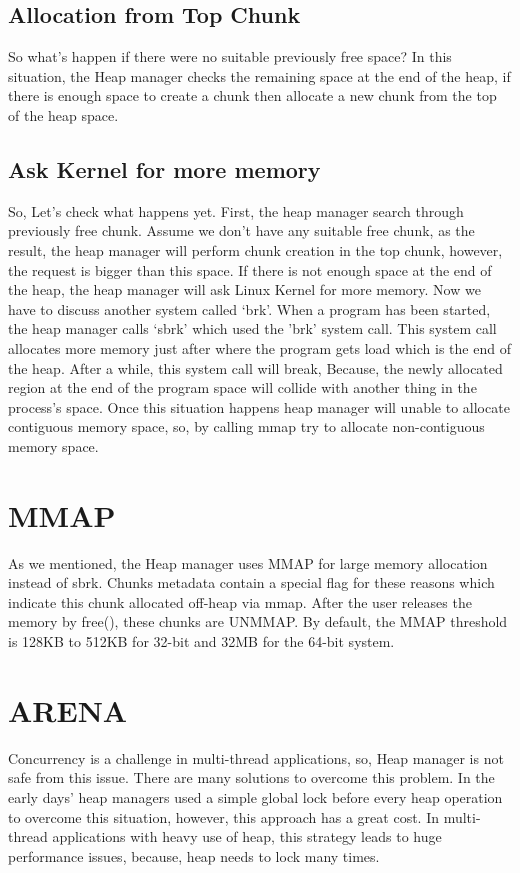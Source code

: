 \documentclass{masterthesis}
\begin{document}
\subsection{Allocation from Top Chunk}
So what’s happen if there were no suitable previously free space? In this situation, the Heap manager checks the remaining space at the end of the heap, if there is enough space to create a chunk then allocate a new chunk from the top of the heap space. 

\subsection{Ask Kernel for more memory}
So, Let's check what happens yet. First, the heap manager search through previously free chunk. Assume we don't have any suitable free chunk, as the result, the heap manager will perform chunk creation in the top chunk, however, the request is bigger than this space. If there is not enough space at the end of the heap, the heap manager will ask Linux Kernel for more memory. Now we have to discuss another system called ‘brk’. When a program has been started, the heap manager calls ‘sbrk’ which used the 'brk' system call. This system call allocates more memory just after where the program gets load which is the end of the heap. 
After a while, this system call will break, Because, the newly allocated region at the end of the program space will collide with another thing in the process’s space. Once this situation happens heap manager will unable to allocate contiguous memory space, so, by calling mmap try to allocate non-contiguous memory space. 

\section{MMAP}
As we mentioned, the Heap manager uses MMAP for large memory allocation instead of sbrk. Chunks metadata contain a special flag for these reasons which indicate this chunk allocated off-heap via mmap. After the user releases the memory by free(), these chunks are UNMMAP. By default, the MMAP threshold is 128KB to 512KB for 32-bit and 32MB for the 64-bit  system.

\section{ARENA}
Concurrency is a challenge in multi-thread applications, so, Heap manager is not safe from this issue. There are many solutions to overcome this problem. In the early days' heap managers used a simple global lock before every heap operation to overcome this situation, however, this approach has a great cost. In multi-thread applications with heavy use of heap, this strategy leads to huge performance issues, because, heap needs to lock many times.
\end{document}

